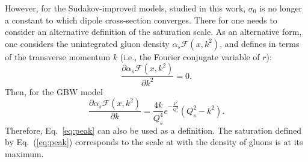 \documentclass[11pt]{article}
\begin{document}
However, for the Sudakov-improved models, studied in this work, $\sigma_0$ is no longer a constant to which dipole cross-section converges.
There for one needs to consider an alternative definition of the saturation scale.
As an alternative form, one considers the unintegrated gluon density $\alpha_s\mathcal{F}(x,k^2)$,
and defines in terms of the transverse momentum $k$ (i.e., the Fourier conjugate variable of $r$):
\begin{equation}
 \frac{\partial \alpha_s \mathcal{F}(x,k^2)}{\partial k^2}=0.
 \label{eq:peak}
\end{equation}
Then, for the GBW model 
\begin{equation}
\frac{\partial \alpha_s \mathcal{F}(x,k^2)}{\partial k}= \frac{4 k}{Q_s^4} { e^{-\frac{k^2}{Q_s^2}}} \left(Q_s^2-k^2\right).
\end{equation}
Therefore, Eq.~\ref{eq:peak} can also be used as a definition.
The saturation defined by Eq.~(\ref{eq:peak}) corresponds to the scale at with the density of gluons is at its maximum.
\end{document}

